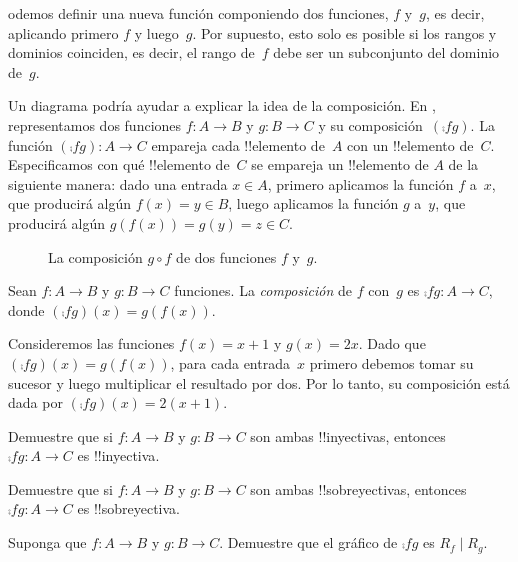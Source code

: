 \documentclass[../../../include/open-logic-section]{subfiles}
\begin{document}

\begin{explain}
odemos definir una nueva función componiendo dos funciones, $f$ y~$g$, es decir, aplicando primero $f$ y luego~$g$. Por supuesto, esto solo es posible si los rangos y dominios coinciden, es decir, el rango de~$f$ debe ser un subconjunto del dominio de~$g$. 

Un diagrama podría ayudar a explicar la idea de la composición. En , representamos dos funciones $f \colon A \to B$ y $g \colon B \to C$ y su composición~$(\comp{f}{g})$. La función $(\comp{f}{g}) \colon A \to C$ empareja cada !!{elemento} de~$A$ con un !!{elemento} de~$C$. Especificamos con qué !!{elemento} de~$C$ se empareja un !!{elemento} de $A$ de la siguiente manera: dado una entrada $x \in A$, primero aplicamos la función $f$ a~$x$, que producirá algún $f(x) = y \in B$, luego aplicamos la función $g$ a~$y$, que producirá algún $g(f(x)) = g(y) = z \in C$.
\begin{figure}
  \caption{La composición $g \circ f$ de dos funciones $f$ y~$g$.}
\end{figure}
\end{explain}

\begin{defn}[Composición]
Sean $f\colon A \to B$ y $g\colon B \to C$ funciones. La \emph{composición} de $f$ con~$g$ es $\comp{f}{g} \colon A \to C$, donde $(\comp{f}{g})(x) = g(f(x))$.
\end{defn}

\begin{ex}
Consideremos las funciones $f(x) = x + 1$ y $g(x) = 2x$. Dado que $(\comp{f}{g})(x) = g(f(x))$, para cada entrada~$x$ primero debemos tomar su sucesor y luego multiplicar el resultado por dos. Por lo tanto, su composición está dada por $(\comp{f}{g})(x) = 2(x+1)$.
\end{ex}

\begin{prob}
Demuestre que si $f \colon A \to B$ y $g \colon B \to C$ son ambas !!{inyectivas}, entonces $\comp{f}{g}\colon A \to C$ es !!{inyectiva}.
\end{prob}

\begin{prob}
Demuestre que si $f \colon A \to B$ y $g \colon B \to C$ son ambas !!{sobreyectivas}, entonces $\comp{f}{g}\colon A \to C$ es !!{sobreyectiva}.
\end{prob}

\begin{prob}
Suponga que $f \colon A \to B$ y $g \colon B \to C$. Demuestre que el gráfico de $\comp{f}{g}$ es $R_f \mid R_g$.
\end{prob}
\end{document}
